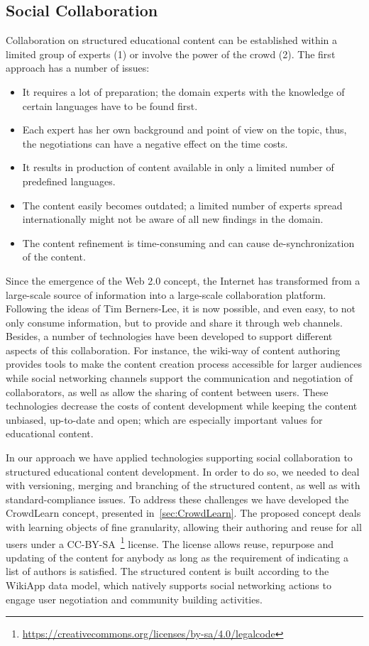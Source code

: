 \documentclass[PhD, Submit, ngerman,UKenglish,table]{scrbook}
\begin{document}
\subsection{Social Collaboration}

Collaboration on structured educational content can be established within a limited group of experts (1) or involve the power of the crowd (2).
The first approach has a number of issues:
\begin{itemize}
\item It requires a lot of preparation; the domain experts with the knowledge of certain languages have to be found first.
\item Each expert has her own background and point of view on the topic, thus, the negotiations can have a negative effect on the time costs. 
\item It results in production of content available in only a limited number of predefined languages.
\item The content easily becomes outdated; a limited number of experts spread internationally might not be aware of all new findings in the domain.
\item The content refinement is time-consuming and can cause de-synchronization of the content.
\end{itemize}

Since the emergence of the Web 2.0 concept, the Internet has transformed from a large-scale source of information into a large-scale collaboration platform.
Following the ideas of Tim Berners-Lee, it is now possible, and even easy, to not only consume information, but to provide and share it through web channels.
Besides, a number of technologies have been developed to support different aspects of this collaboration.
For instance, the wiki-way of content authoring provides tools to make the content creation process accessible for larger audiences while social networking channels support the communication and negotiation of collaborators, as well as allow the sharing of content between users.
These technologies decrease the costs of content development while keeping the content unbiased, up-to-date and open; which are especially important values for educational content.

In our approach we have applied technologies supporting social collaboration to structured educational content development.
In order to do so, we needed to deal with versioning, merging and branching of the structured content, as well as with standard-compliance issues.
To address these challenges we have developed the CrowdLearn concept, presented in~\autoref{sec:CrowdLearn}.
The proposed concept deals with learning objects of fine granularity, allowing their authoring and reuse for all users under a CC-BY-SA~\footnote{\url{https://creativecommons.org/licenses/by-sa/4.0/legalcode}} license.
The license allows reuse, repurpose and updating of the content for anybody as long as the requirement of indicating a list of authors is satisfied.
The structured content is built according to the WikiApp data model, which natively supports social networking actions to engage user negotiation and community building activities.
\end{document}
